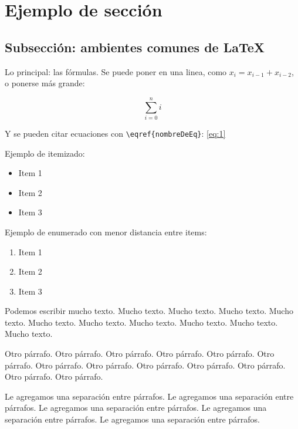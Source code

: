 \documentclass[10pt,a4paper]{article}
\begin{document}
\maketitle

\section{Ejemplo de sección}
\subsection{Subsección: ambientes comunes de \LaTeX}

Lo principal: las fórmulas. Se puede poner en una linea, como $x_i = x_{i-1} + x_{i-2}$, o ponerse más grande:

\begin{equation}
	\sum\limits_{i=0}^{n} i
	\label{eq:1}
\end{equation}

Y se pueden citar ecuaciones con \verb|\eqref{nombreDeEq}|: \eqref{eq:1}

Ejemplo de itemizado:

\begin{itemize}
	\item Item 1
	\item Item 2
	\item Item 3
\end{itemize}

Ejemplo de enumerado con menor distancia entre items:

\begin{enumerate} \setlength\itemsep{0cm}
	\item Item 1
	\item Item 2
	\item Item 3
\end{enumerate}

Podemos escribir mucho texto. Mucho texto. Mucho texto. Mucho texto. Mucho texto. Mucho texto. Mucho texto. Mucho texto. Mucho texto. Mucho texto. Mucho texto.

Otro párrafo. Otro párrafo. Otro párrafo. Otro párrafo. Otro párrafo. Otro párrafo. Otro párrafo. Otro párrafo. Otro párrafo. Otro párrafo. Otro párrafo. Otro párrafo. Otro párrafo.

\vspace{0.3cm}

Le agregamos una separación entre párrafos. Le agregamos una separación entre párrafos. Le agregamos una separación entre párrafos. Le agregamos una separación entre párrafos. Le agregamos una separación entre párrafos.
\end{document}
